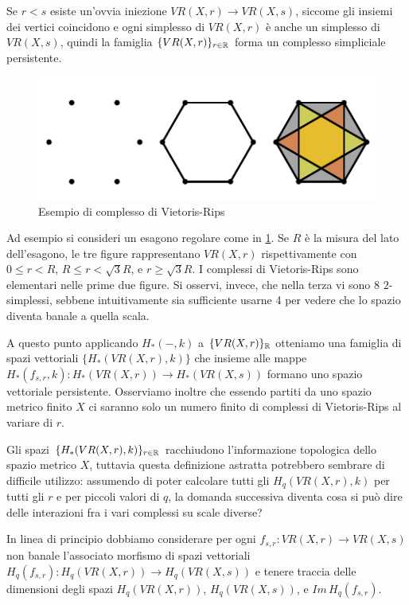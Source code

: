 \begin{rmk}
  Se $r<s$ esiste un'ovvia iniezione $VR(X,r)\to VR(X,s)$, siccome gli insiemi dei vertici coincidono e ogni simplesso di $VR(X,r)$ è anche un simplesso di $VR(X,s)$, quindi la famiglia $\{VR(X,r)\}_{r\in\mathbb{R}}$ forma un complesso simpliciale persistente.
\end{rmk}

\begin{figure}[h]
  \includegraphics[width=.7\linewidth]{gfx/exhagon.pdf}
  \caption{Esempio di complesso di Vietoris-Rips}
  \label{fig:exhagon}
\end{figure}

Ad esempio si consideri un esagono regolare come in \cref{fig:exhagon}. Se $R$ è la misura del lato dell'esagono, le tre figure rappresentano $VR(X,r)$ rispettivamente con $0\leq r < R$, $R\leq r < \sqrt{3}R$, e $r \geq \sqrt{3}R$. I complessi di Vietoris-Rips sono elementari nelle prime due figure. Si osservi, invece, che nella terza vi sono 8 $2$-simplessi, sebbene intuitivamente sia sufficiente usarne 4 per vedere che lo spazio diventa banale a quella scala.

\begin{sloppypar}
  A questo punto applicando $H_*(-,k)$ a $\{VR(X,r)\}_{\mathbb{R}}$ otteniamo una famiglia di spazi vettoriali $\{H_*(VR(X,r),k)\}$ che insieme alle mappe ${H_*(f_{s,r},k):H_*(VR(X,r))\to H_*(VR(X,s))}$ formano uno spazio vettoriale persistente. Osserviamo inoltre che essendo partiti da uno spazio metrico finito $X$ ci saranno solo un numero finito di complessi di Vietoris-Rips al variare di $r$.
\end{sloppypar}

Gli spazi $\{H_*(VR(X,r),k)\}_{r\in\mathbb{R}}$ racchiudono l'informazione topologica dello spazio metrico $X$, tuttavia questa definizione astratta potrebbero sembrare di difficile utilizzo: assumendo di poter calcolare tutti gli $H_q(VR(X,r),k)$ per tutti gli $r$ e per piccoli valori di $q$, la domanda successiva diventa cosa si può dire delle interazioni fra i vari complessi su scale diverse?

\begin{sloppypar}
  In linea di principio dobbiamo considerare per ogni ${f_{s,r}:VR(X,r)\to VR(X,s)}$ non banale l'associato morfismo di spazi vettoriali ${H_q(f_{s,r}):H_q(VR(X,r))\to H_q(VR(X,s))}$ e tenere traccia delle dimensioni degli spazi $H_q(VR(X,r))$, $H_q(VR(X,s))$, e $Im\,H_q(f_{s,r})$.
\end{sloppypar}

